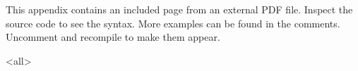 \label{ch:pdf}

\begin{explanation}
This appendix contains an included page from an external PDF file. Inspect the source code to see the syntax. More examples can be found in the comments. Uncomment and recompile to make them appear.
\end{explanation}




%

%


\mode<all>
